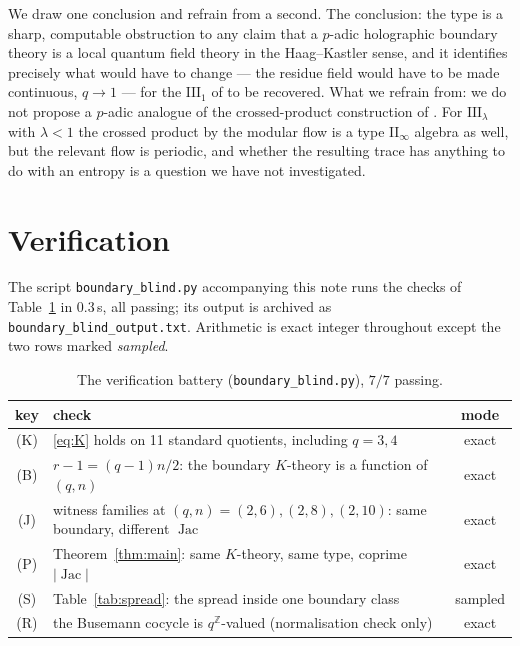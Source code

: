 \documentclass[11pt]{article}
\theoremstyle{plain}
\theoremstyle{remark}
\newcommand{\Z}{\mathbb{Z}}
\newcommand{\Jac}{\operatorname{Jac}}
\newcommand{\III}{\mathrm{III}}
\begin{document}
We draw one conclusion and refrain from a second. The conclusion: the type is a sharp,
computable obstruction to any claim that a $p$-adic holographic boundary theory is a local
quantum field theory in the Haag--Kastler sense, and it identifies precisely what would
have to change --- the residue field would have to be made continuous, $q\to1$ --- for the
$\III_1$ of \cite{LL1,Witten22} to be recovered. What we refrain from: we do not propose a
$p$-adic analogue of the crossed-product construction of \cite{Witten22}. For
$\III_\lambda$ with $\lambda<1$ the crossed product by the modular flow is a type
$\mathrm{II}_\infty$ algebra as well, but the relevant flow is periodic, and whether the
resulting trace has anything to do with an entropy is a question we have not investigated.

\section{Verification}\label{sec:battery}

The script \texttt{boundary\_blind.py} accompanying this note runs the checks of
Table~\ref{tab:battery} in $0.3$\,s, all passing; its output is archived as
\texttt{boundary\_blind\_output.txt}. Arithmetic is exact integer throughout except the two
rows marked \emph{sampled}.

\begin{table}[ht]
\centering\small
\begin{tabular}{clc}
\toprule
key & check & mode\\
\midrule
(K) & \eqref{eq:K} holds on 11 standard quotients, including $q=3,4$ & exact\\
(B) & $r-1=(q-1)n/2$: the boundary $K$-theory is a function of $(q,n)$ & exact\\
(J) & witness families at $(q,n)=(2,6),(2,8),(2,10)$: same boundary, different $\Jac$ & exact\\
(P) & Theorem~\ref{thm:main}: same $K$-theory, same type, coprime $|\Jac|$ & exact\\
(S) & Table~\ref{tab:spread}: the spread inside one boundary class & sampled\\
(R) & the Busemann cocycle is $q^{\Z}$-valued (normalisation check only) & exact\\
\bottomrule
\end{tabular}
\caption{The verification battery (\texttt{boundary\_blind.py}), $7/7$ passing.}
\label{tab:battery}
\end{table}
\end{document}
